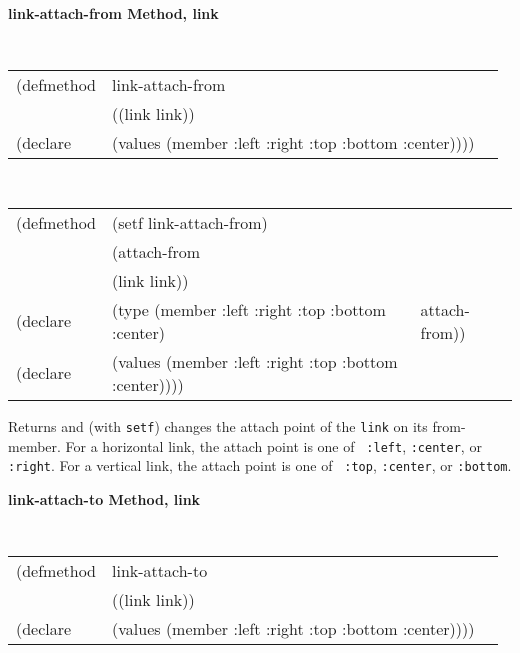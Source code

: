 {\samepage
{\large {\bf link-attach-from \hfill Method, link}}
\begin{flushright} \parbox[t]{6.125in}{
\tt
\begin{tabular}{lll}
\raggedright
(defmethod & link-attach-from & \\
           & ((link  link)) \\
(declare   & (values (member :left :right :top :bottom :center))))
\end{tabular}
\rm

}\end{flushright}}

{\samepage
\begin{flushright} \parbox[t]{6.125in}{
\tt
\begin{tabular}{lll}
\raggedright
(defmethod & (setf link-attach-from) & \\
         & (attach-from \\
         & (link link)) \\
(declare &(type (member :left :right :top :bottom :center) & attach-from))\\
(declare &(values (member :left :right :top :bottom :center))))
\end{tabular}
\rm
}
\end{flushright}}


\begin{flushright} \parbox[t]{6.125in}{
Returns and (with {\tt setf}) changes the attach point of the {\tt link} on
its from-member. For a horizontal link, the attach point is one of {\tt
:left}, {\tt :center}, or {\tt :right}. For a vertical link, the attach point is one of {\tt
:top}, {\tt :center}, or {\tt :bottom}.

}\end{flushright}


{\samepage
{\large {\bf link-attach-to \hfill Method, link}}
\begin{flushright} \parbox[t]{6.125in}{
\tt
\begin{tabular}{lll}
\raggedright
(defmethod & link-attach-to & \\
           & ((link  link)) \\
(declare   & (values (member :left :right :top :bottom :center))))
\end{tabular}
\rm

}\end{flushright}}

